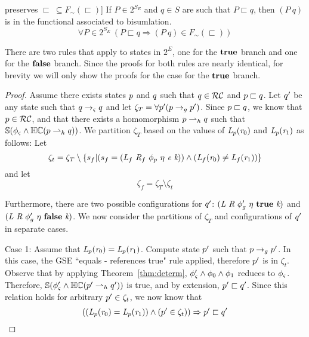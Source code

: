 \begin{lemma} preserves $\sqsubset\ \subseteq F_\sim(\sqsubset)$]
If $P \in 2^{S_\mathit{E}}$ and $q \in S$ are such that $P \sqsubset q$, then $(P\ q)$ is in the functional associated to bisumlation.
\label{lem:compare}
$$
\forall P \in 2^{S_\mathit{E}}\ (P \sqsubset q \Rightarrow (P\ q) \in F_\sim(\sqsubset))
$$
\end{lemma}

There are two rules that apply to states in $2^{E}$, one for the $\textbf{true}$ branch and one for the $\textbf{false}$ branch. Since the proofs for both rules are nearly identical, for brevity we will only show the proofs for the case for the $\textbf{true}$ branch. 
\begin{proof}
Assume there exists states $p$ and $q$ such that $q \in \mathcal{RC}$ and $p \sqsubset q$. Let $q^\prime$ be any state such that $q \rightarrow_{\varsigma} q$ and let $\zeta_T = \forall p^\prime ( p \rightarrow_{g} p^\prime )$. Since $p \sqsubset q$, we know that $p \in \mathcal{RC}$, and that there exists a homomorphism $p \rightharpoonup_{h} q$ such that $\mathbb{S}( \phi_{\varsigma} \wedge \mathbb{HC}(p \rightharpoonup_{h} q) ) $. We partition $\zeta_T$ based on the values of $\emph{L}_{p} ( \emph{r}_0)$ and $\emph{L}_{p} ( \emph{r}_1 )$ as follows: Let
$$\zeta_t = \zeta_T \setminus \{ s_f | (s_f= ( \emph{L}_f\ \emph{R}_f\ \phi_{p}\ \eta\ \emph{e}\ \emph{k})) \wedge (\emph{L}_f ( \emph{r}_0) \neq \emph{L}_f ( \emph{r}_1 ) ) \}$$
and let
$$\zeta_f = \zeta_T \setminus \zeta_t$$ 

Furthermore, there are two possible configurations for $q^\prime$: $\lp \cfgnt{L}\ \cfgnt{R}\ \phi_g^\prime\ \eta\ \cfgt{true}\ \cfgnt{k}\rp $ and $\lp \cfgnt{L}\ \cfgnt{R}\ \phi_g^\prime\ \eta\ \cfgt{false}\ \cfgnt{k}\rp $. We now consider the partitions of $\zeta_T$ and configurations of $q^\prime$ in separate cases.

Case 1: Assume that $\emph{L}_{p} ( \emph{r}_0) = \emph{L}_{p} ( \emph{r}_1 )$. 
Compute state $p^\prime$ such that $p \rightarrow_{g} p^\prime$. In this case, the GSE ``equals - references true" rule applied, therefore $p^\prime$ is in $\zeta_t$. Observe that by applying Theorem~\ref{thm:determ}, $\phi_{\varsigma}^\prime \wedge \phi_0 \wedge \phi_1$ reduces to $\phi_{\varsigma}$. Therefore, $\mathbb{S}( \phi_{\varsigma}^\prime \wedge \mathbb{HC}(p^\prime \rightharpoonup_{h} q^\prime) ) $ is true, and by extension, $p^\prime \sqsubset q^\prime$. Since this relation holds for arbitrary $p^\prime \in \zeta_t$, we now know that 
\begin{equation}
\label{eqn:RCForwardsTrue}
((\emph{L}_{p} ( \emph{r}_0) = \emph{L}_{p} ( \emph{r}_1 )) \wedge (p^\prime \in \zeta_t)) \Rightarrow p^\prime \sqsubset q^\prime
\end{equation}


\end{proof}
